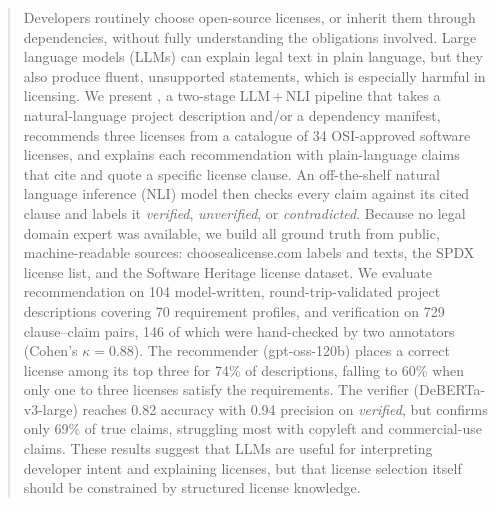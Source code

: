 \begin{abstract}
Developers routinely choose open-source licenses, or inherit them through dependencies, without fully understanding the obligations involved. Large language models (LLMs) can explain legal text in plain language, but they also produce fluent, unsupported statements, which is especially harmful in licensing. We present \sys{}, a two-stage LLM\,+\,NLI pipeline that takes a natural-language project description and/or a dependency manifest, recommends three licenses from a catalogue of 34 OSI-approved software licenses, and explains each recommendation with plain-language claims that cite and quote a specific license clause. An off-the-shelf natural language inference (NLI) model then checks every claim against its cited clause and labels it \emph{verified}, \emph{unverified}, or \emph{contradicted}. Because no legal domain expert was available, we build all ground truth from public, machine-readable sources: choosealicense.com labels and texts, the SPDX license list, and the Software Heritage license dataset. We evaluate recommendation on 104 model-written, round-trip-validated project descriptions covering 70 requirement profiles, and verification on 729 clause--claim pairs, 146 of which were hand-checked by two annotators (Cohen's $\kappa = 0.88$). The recommender (gpt-oss-120b) places a correct license among its top three for 74\% of descriptions, falling to 60\% when only one to three licenses satisfy the requirements. The verifier (DeBERTa-v3-large) reaches 0.82 accuracy with 0.94 precision on \emph{verified}, but confirms only 69\% of true claims, struggling most with copyleft and commercial-use claims. These results suggest that LLMs are useful for interpreting developer intent and explaining licenses, but that license selection itself should be constrained by structured license knowledge.
\end{abstract}
